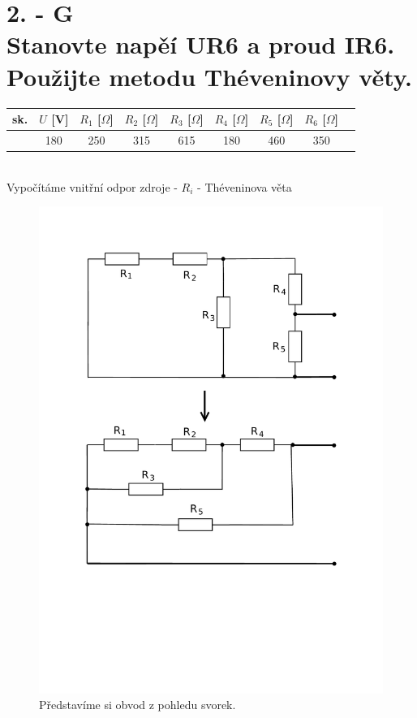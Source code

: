 \documentclass[12pt,a4paper]{article}         %
\begin{document}
    \newpage
    
    \section*{2. - G \\
    Stanovte napěí UR6 a proud IR6. Použijte metodu Théveninovy věty.}
    
    \begin{tabular}{|c|c|c|c|c|c|c|c|c|} \hline
sk. & $U$ [V] & $R_1$ [$\Omega$] & $R_2$ [$\Omega$] & $R_3$ [$\Omega$] & $R_4$ [$\Omega$] & $R_5$ [$\Omega$] & $R_6$ [$\Omega$] \\ \hline
    {G & 180 & 250 & 315 & 615 & 180 & 460 & 350}{}
    \\ \hline \end{tabular} \\
    
    
    {\Large Vypočítáme vnitřní odpor zdroje - $R_i$ - Théveninova věta}
    
    \begin{figure}[H]
		\vspace{-0.6cm}
		\center\includegraphics[trim={0 7cm 0 0},clip,width=0.8\linewidth]{obr/2_2}
		\caption*{Představíme si obvod z pohledu svorek.}
    \end{figure}
    
\end{document}
